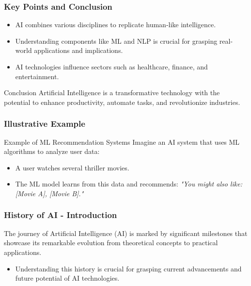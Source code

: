 \documentclass[aspectratio=169]{beamer}
\begin{document}
\begin{frame}[fragile]
    \frametitle{Key Points and Conclusion}
    \begin{itemize}
        \item AI combines various disciplines to replicate human-like intelligence.
        \item Understanding components like ML and NLP is crucial for grasping real-world applications and implications.
        \item AI technologies influence sectors such as healthcare, finance, and entertainment.
    \end{itemize}
    
    \begin{block}{Conclusion}
        Artificial Intelligence is a transformative technology with the potential to enhance productivity, automate tasks, and revolutionize industries.
    \end{block}
\end{frame}

\begin{frame}[fragile]
    \frametitle{Illustrative Example}
    \begin{block}{Example of ML Recommendation Systems}
        Imagine an AI system that uses ML algorithms to analyze user data:
        \begin{itemize}
            \item A user watches several thriller movies.
            \item The ML model learns from this data and recommends:
            \vspace{0.1cm}
            \textit{"You might also like: [Movie A], [Movie B]."}
        \end{itemize}
    \end{block}
\end{frame}

\begin{frame}[fragile]
    \frametitle{History of AI - Introduction}
    The journey of Artificial Intelligence (AI) is marked by significant milestones that showcase its remarkable evolution from theoretical concepts to practical applications. 
    \begin{itemize}
        \item Understanding this history is crucial for grasping current advancements and future potential of AI technologies.
    \end{itemize}
\end{frame}
\end{document}
